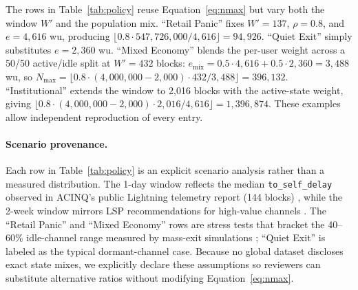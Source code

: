 \documentclass{article}
\theoremstyle{definition}
\begin{document}
\begin{table}[h]
\centering
\caption{System Limits by Policy ($W'$) and Network State ($\rho=0.8$)}\label{tab:policy}
\end{table}

The rows in Table~\ref{tab:policy} reuse Equation~\eqref{eq:nmax} but vary both the window $W'$ and the population mix. ``Retail Panic'' fixes $W'=137$, $\rho=0.8$, and $e=4{,}616$ wu, producing $\lfloor 0.8 \cdot 547{,}726{,}000 / 4{,}616 \rfloor = 94{,}926$. ``Quiet Exit'' simply substitutes $e=2{,}360$ wu. ``Mixed Economy'' blends the per-user weight across a 50/50 active/idle split at $W'=432$ blocks: $e_{\mathrm{mix}} = 0.5 \cdot 4{,}616 + 0.5 \cdot 2{,}360 = 3{,}488$ wu, so $N_{\max} = \lfloor 0.8 \cdot (4{,}000{,}000 - 2{,}000) \cdot 432 / 3{,}488 \rfloor = 396{,}132$. ``Institutional'' extends the window to 2{,}016 blocks with the active-state weight, giving $\lfloor 0.8 \cdot (4{,}000{,}000 - 2{,}000) \cdot 2{,}016 / 4{,}616 \rfloor = 1{,}396{,}874$. These examples allow independent reproduction of every entry.

\paragraph{Scenario provenance.}
Each row in Table~\ref{tab:policy} is an explicit scenario analysis rather than a measured distribution. The 1-day window reflects the median \texttt{to\_self\_delay} observed in ACINQ's public Lightning telemetry report (144 blocks) \cite{acinqTelemetry}, while the 2-week window mirrors LSP recommendations for high-value channels \cite{Law2023}. The ``Retail Panic'' and ``Mixed Economy'' rows are stress tests that bracket the 40--60\% idle-channel range measured by mass-exit simulations \cite{sguanci2022}; ``Quiet Exit'' is labeled as the typical dormant-channel case. Because no global dataset discloses exact state mixes, we explicitly declare these assumptions so reviewers can substitute alternative ratios without modifying Equation~\eqref{eq:nmax}.
\end{document}
